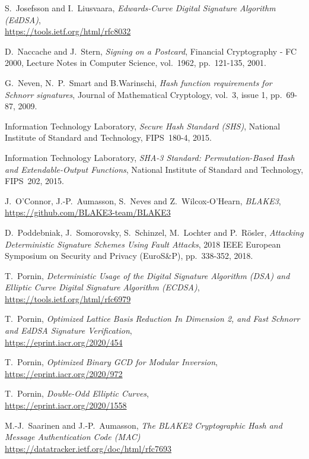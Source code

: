 \documentclass{llncs}
\begin{document}
\begin{thebibliography}{20}
S.~Josefsson and I.~Liusvaara,
\emph{Edwards-Curve Digital Signature Algorithm (EdDSA)},\\
\url{https://tools.ietf.org/html/rfc8032}

D.~Naccache and J.~Stern,
\emph{Signing on a Postcard},
Financial Cryptography - FC 2000, Lecture Notes in Computer Science,
vol.~1962, pp.~121-135, 2001.

G.~Neven, N.~P.~Smart and B.Warinschi,
\emph{Hash function requirements for Schnorr signatures},
Journal of Mathematical Cryptology, vol.~3, issue 1, pp.~69-87, 2009.

Information Technology Laboratory,
\emph{Secure Hash Standard (SHS)},
National Institute of Standard and Technology, FIPS~180-4, 2015.

Information Technology Laboratory,
\emph{SHA-3 Standard: Permutation-Based Hash and Extendable-Output
Functions},
National Institute of Standard and Technology, FIPS~202, 2015.

J.~O'Connor, J.-P.~Aumasson, S.~Neves and Z.~Wilcox-O'Hearn,
\emph{BLAKE3},\\
\url{https://github.com/BLAKE3-team/BLAKE3}

D.~Poddebniak, J.~Somorovsky, S.~Schinzel, M.~Lochter and P.~Rösler,
\emph{Attacking Deterministic Signature Schemes Using Fault Attacks},
2018 IEEE European Symposium on Security and Privacy (EuroS\&P),
pp.~338-352, 2018.

T.~Pornin,
\emph{Deterministic Usage of the Digital Signature Algorithm (DSA) and
Elliptic Curve Digital Signature Algorithm (ECDSA)},\\
\url{https://tools.ietf.org/html/rfc6979}

T.~Pornin,
\emph{Optimized Lattice Basis Reduction In Dimension 2, and Fast Schnorr
and EdDSA Signature Verification},\\
\url{https://eprint.iacr.org/2020/454}

T.~Pornin,
\emph{Optimized Binary GCD for Modular Inversion},\\
\url{https://eprint.iacr.org/2020/972}

T.~Pornin,
\emph{Double-Odd Elliptic Curves},\\
\url{https://eprint.iacr.org/2020/1558}

M.-J.~Saarinen and J.-P.~Aumasson,
\emph{The BLAKE2 Cryptographic Hash and Message Authentication Code (MAC)}\\
\url{https://datatracker.ietf.org/doc/html/rfc7693}


\end{thebibliography}
\end{document}
